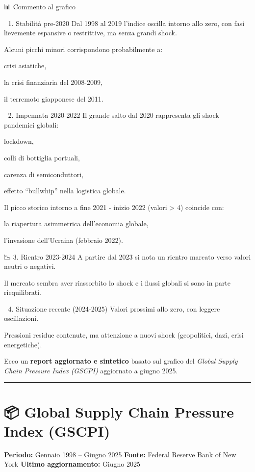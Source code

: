 \documentclass[
  11pt,
  letterpaper,
  DIV=11,
  numbers=noendperiod]{scrartcl}
\begin{document}
📊 Commento al grafico

📌 1. Stabilità pre-2020 Dal 1998 al 2019 l'indice oscilla intorno allo
zero, con fasi lievemente espansive o restrittive, ma senza grandi
shock.

Alcuni picchi minori corrispondono probabilmente a:

crisi asiatiche,

la crisi finanziaria del 2008-2009,

il terremoto giapponese del 2011.

🚨 2. Impennata 2020-2022 Il grande salto dal 2020 rappresenta gli shock
pandemici globali:

lockdown,

colli di bottiglia portuali,

carenza di semiconduttori,

effetto ``bullwhip'' nella logistica globale.

Il picco storico intorno a fine 2021 - inizio 2022 (valori
\textgreater{} 4) coincide con:

la riapertura asimmetrica dell'economia globale,

l'invasione dell'Ucraina (febbraio 2022).

📉 3. Rientro 2023-2024 A partire dal 2023 si nota un rientro marcato
verso valori neutri o negativi.

Il mercato sembra aver riassorbito lo shock e i flussi globali si sono
in parte riequilibrati.

🟰 4. Situazione recente (2024-2025) Valori prossimi allo zero, con
leggere oscillazioni.

Pressioni residue contenute, ma attenzione a nuovi shock (geopolitici,
dazi, crisi energetiche).

Ecco un \textbf{report aggiornato e sintetico} basato sul grafico del
\emph{Global Supply Chain Pressure Index (GSCPI)} aggiornato a giugno
2025.

\begin{center}\rule{0.5\linewidth}{0.5pt}\end{center}

\section{📦 Global Supply Chain Pressure Index
(GSCPI)}\label{global-supply-chain-pressure-index-gscpi}

\textbf{Periodo:} Gennaio 1998 -- Giugno 2025 \textbf{Fonte:} Federal
Reserve Bank of New York \textbf{Ultimo aggiornamento:} Giugno 2025
\end{document}

